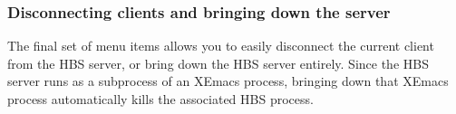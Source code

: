 \subsubsection{Disconnecting clients and bringing down the server}

The final set of menu items allows you to easily disconnect the current
client from the HBS server, or bring down the HBS server entirely.  Since
the HBS server runs as a subprocess of an XEmacs process, bringing down
that XEmacs process automatically kills the associated HBS process. 


















